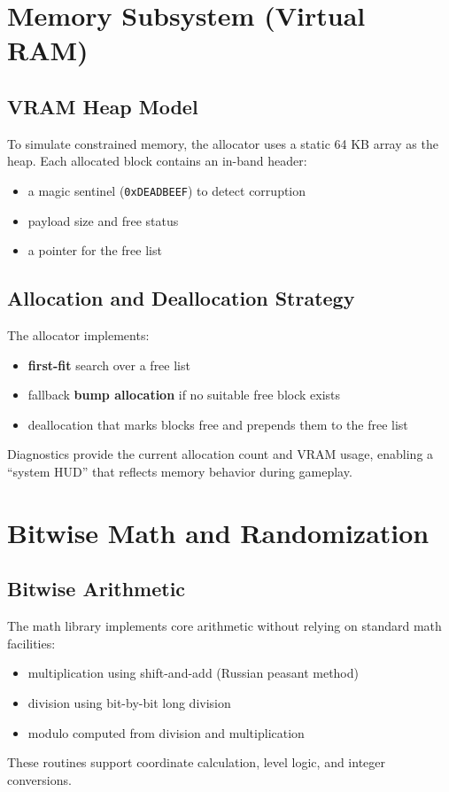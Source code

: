 \documentclass[conference]{IEEEtran}
\begin{document}
\section{Memory Subsystem (Virtual RAM)}
\subsection{VRAM Heap Model}
To simulate constrained memory, the allocator uses a static 64 KB array as the heap. Each allocated block contains an in-band header:
\begin{itemize}
    \item a magic sentinel (\texttt{0xDEADBEEF}) to detect corruption
    \item payload size and free status
    \item a pointer for the free list
\end{itemize}

\subsection{Allocation and Deallocation Strategy}
The allocator implements:
\begin{itemize}
    \item \textbf{first-fit} search over a free list
    \item fallback \textbf{bump allocation} if no suitable free block exists
    \item deallocation that marks blocks free and prepends them to the free list
\end{itemize}
Diagnostics provide the current allocation count and VRAM usage, enabling a ``system HUD'' that reflects memory behavior during gameplay.

\section{Bitwise Math and Randomization}
\subsection{Bitwise Arithmetic}
The math library implements core arithmetic without relying on standard math facilities:
\begin{itemize}
    \item multiplication using shift-and-add (Russian peasant method)
    \item division using bit-by-bit long division
    \item modulo computed from division and multiplication
\end{itemize}
These routines support coordinate calculation, level logic, and integer conversions.
\end{document}
